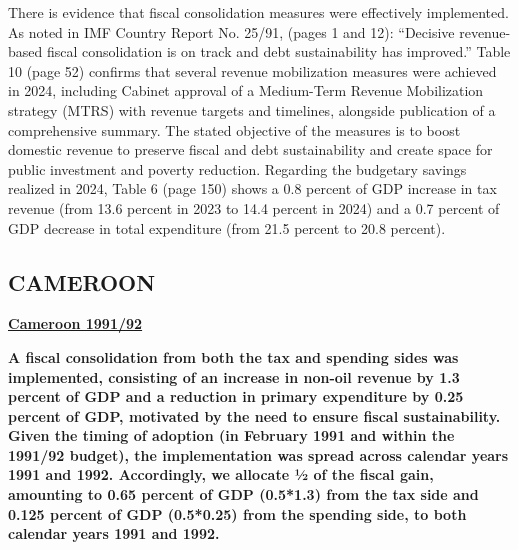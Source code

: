 There is evidence that fiscal consolidation measures were effectively implemented. As noted in IMF Country Report No. 25/91, (pages 1 and 12): “Decisive revenue-based fiscal consolidation is on track and debt sustainability has improved.” Table 10 (page 52) confirms that several revenue mobilization measures were achieved in 2024, including Cabinet approval of a Medium-Term Revenue Mobilization strategy (MTRS) with revenue targets and timelines, alongside publication of a comprehensive summary. The stated objective of the measures is to boost domestic revenue to preserve fiscal and debt sustainability and create space for public investment and poverty reduction. Regarding the budgetary savings realized in 2024, Table 6 (page 150) shows a 0.8 percent of GDP increase in tax revenue (from 13.6 percent in 2023 to 14.4 percent in 2024) and a 0.7 percent of GDP decrease in total expenditure (from 21.5 percent to 20.8 percent).

\subsection[CAMEROON]{CAMEROON\protect\footnotemark}

\textbf{\underline{Cameroon 1991/92}} 

\textbf{A fiscal consolidation from both the tax and spending sides was implemented, consisting of an increase in non-oil revenue by 1.3 percent of GDP and a reduction in primary expenditure by 0.25 percent of GDP, motivated by the need to ensure fiscal sustainability. Given the timing of adoption (in February 1991 and within the 1991/92 budget), the implementation was spread across calendar years 1991 and 1992. Accordingly, we allocate ½ of the fiscal gain, amounting to 0.65 percent of GDP (0.5*1.3) from the tax side and 0.125 percent of GDP (0.5*0.25) from the spending side, to both calendar years 1991 and 1992.}

